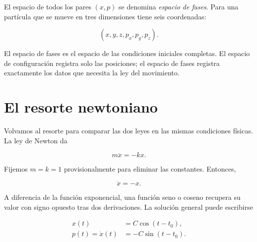 El espacio de todos los pares \((x,p)\) se denomina \emph{espacio de fases}. Para una partícula que se mueve en tres dimensiones tiene seis coordenadas:

\begin{equation}
  (x,y,z,p_x,p_y,p_z).
  \label{eq:one-particle-phase-space}
\end{equation}

El espacio de fases es el espacio de las condiciones iniciales completas. El espacio de configuración registra solo las posiciones; el espacio de fases registra exactamente los datos que necesita la ley del movimiento.

\begin{classroomqa}\end{classroomqa}

\section{El resorte newtoniano}

Volvamos al resorte para comparar las dos leyes en las mismas condiciones físicas. La ley de Newton da

\begin{equation}
  m\ddot x=-kx.
  \label{eq:newton-spring}
\end{equation}

Fijemos \(m=k=1\) provisionalmente para eliminar las constantes. Entonces,

\begin{equation}
  \ddot x=-x.
  \label{eq:normalized-oscillator}
\end{equation}

A diferencia de la función exponencial, una función seno o coseno recupera su valor con signo opuesto tras dos derivaciones. La solución general puede escribirse

\begin{align}
  x(t)&=C\cos(t-t_0),
  \label{eq:oscillator-x}\\
  p(t)=\dot x(t)&=-C\sin(t-t_0).
  \label{eq:oscillator-p}
\end{align}

